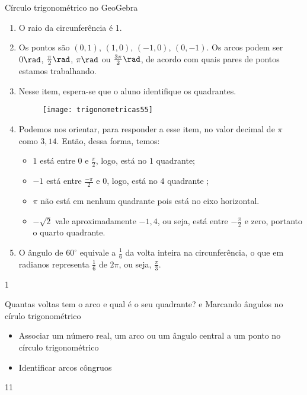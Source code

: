 \def\currentcolor{session2}
\begin{answer}{Círculo trigonométrico no GeoGebra}
{
	\begin{enumerate}
	\item O raio da circunferência é 1.
	\item  Os pontos são $(0,1)$, $(1,0)$, $(-1,0)$, $(0,-1)$. Os arcos podem ser $0\rad$, $\frac{\pi}{2}\rad$, $\pi\rad$ ou $\frac{3\pi}{2}\rad$, de acordo com quais pares de pontos estamos trabalhando.
	\item Nesse item, espera-se que o aluno identifique os quadrantes.
	\begin{figure}[H]
	\centering
	
	\texttt{[image: trigonometricas55]}
	\end{figure}

	\item Podemos nos orientar, para responder a esse item, no valor decimal de $\pi$ como $3{,}14$. Então, dessa forma, temos: 
	\begin{itemize}
	\item $1$ está entre $0$ e $\frac{\pi}{2}$, logo, está no $1$ quadrante;
	\item $-1$ está entre $\frac{-\pi}{2}$ e $0$, logo, está no $4$ quadrante ;
	\item $\pi$ não está em nenhum quadrante pois está no eixo horizontal. 
	\item $-\sqrt{2}$ vale aproximadamente $-1{,}4$, ou seja, está entre $-\frac{\pi}{2}$ e zero, portanto o quarto quadrante.
	\end{itemize}
	\item O ângulo de $60^{\circ}$ equivale a $\frac{1}{6}$ da volta inteira na circunferência, o que em radianos representa $\frac{1}{6}$ de $2\pi$, ou seja, $\frac{\pi}{3}$.
	\end{enumerate}
}{1}
\end{answer}
\clearmargin
\marginpar{\vspace{-1em}}
\begin{objectives}{Quantas voltas tem o arco e qual é o seu quadrante?  e Marcando ângulos no círulo trigonométrico}
{
	\begin{itemize}
	\item Associar um número real, um arco ou um ângulo central a um ponto no círculo trigonométrico
	\item Identificar arcos côngruos
	\end{itemize}
}
{1}{1}
\end{objectives}
